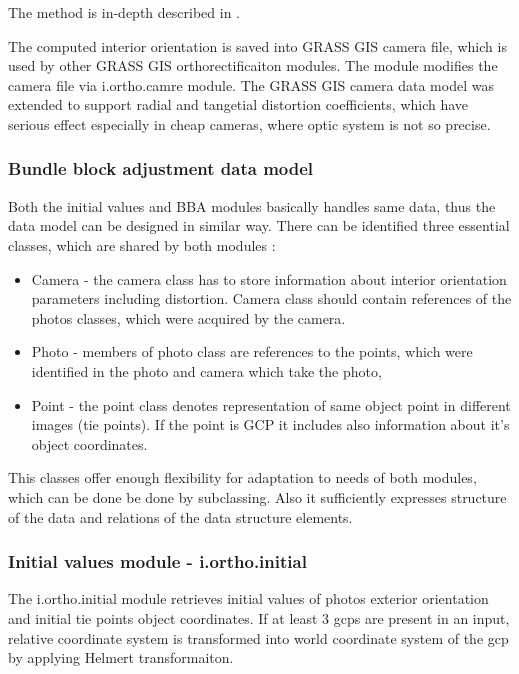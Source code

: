 \documentclass[a4paper,12pt]{article}
\begin{document}
The method is in-depth described 
in \cite{zhang2000flexible}.

The computed interior orientation is saved into GRASS GIS camera file, which is used by other GRASS GIS 
orthorectificaiton modules. The module modifies the camera file via i.ortho.camre module.
The GRASS GIS camera data model was extended to support radial and tangetial distortion coefficients, which 
have serious effect especially in cheap cameras, where optic system is not so precise.

\subsubsection{Bundle block adjustment data model}
 
Both the initial values and BBA modules basically handles  same data, thus 
the data model can be designed in similar way. There can be 
identified three essential classes, which are shared by both modules :
\begin{itemize}
\item Camera - the camera class has to store information about interior orientation 
parameters including distortion. Camera class should contain references of the photos
classes, which were acquired by the camera.
\item Photo - members of photo class are references to the points, which were identified 
	    in the photo and camera which take the photo,
\item Point - the point class denotes representation of same object point in different images (tie points).
 If the point is GCP it includes also information about it's object coordinates. 
\end{itemize}


This classes offer enough flexibility for adaptation to needs of both modules, which can be done be done by subclassing. 
Also it sufficiently expresses  structure of the data and relations of the data structure elements.

\subsubsection{Initial values module - i.ortho.initial}

The i.ortho.initial module retrieves initial values of photos exterior orientation and initial tie points object coordinates. If at least 3 gcps are 
present in an input, relative coordinate system is transformed into world coordinate system of the gcp by applying Helmert transformaiton. 
\end{document}
